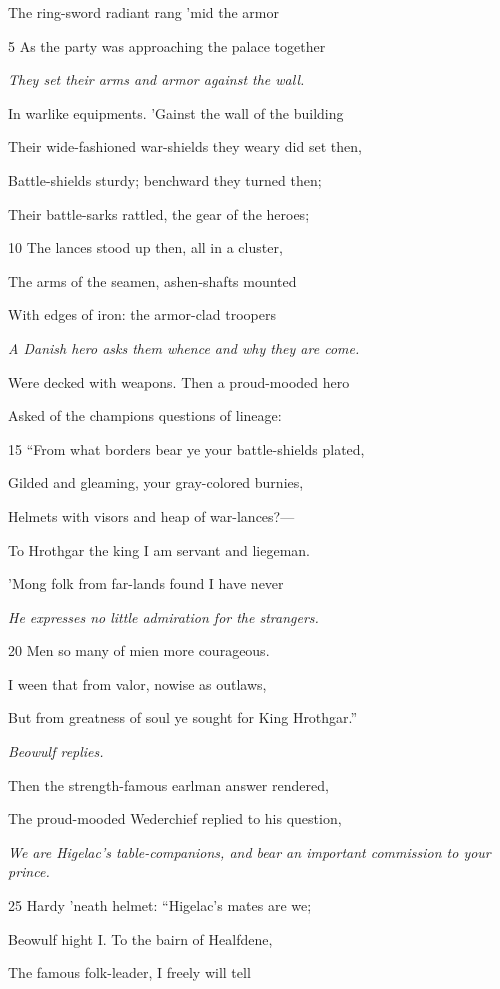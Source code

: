 The ring-sword radiant rang ’mid the armor

5
As the party was approaching the palace together

\emph{They set their
arms and armor
against the wall.}

In warlike equipments. ’Gainst the wall of the building

Their wide-fashioned war-shields they weary did set then,

Battle-shields sturdy; benchward they turned then;

Their battle-sarks rattled, the gear of the heroes;

10
The lances stood up then, all in a cluster,

The arms of the seamen, ashen-shafts mounted

With edges of iron: the armor-clad troopers

\emph{A Danish hero
asks them whence
and why they are
come.}

Were decked with weapons. Then a proud-mooded hero

Asked of the champions questions of lineage:

15
“From what borders bear ye your battle-shields plated,

Gilded and gleaming, your gray-colored burnies,

Helmets with visors and heap of war-lances?—

To Hrothgar the king I am servant and liegeman.

’Mong folk from far-lands found I have never

\emph{He expresses no
little admiration
for the strangers.}

20
Men so many of mien more courageous.

I ween that from valor, nowise as outlaws,

But from greatness of soul ye sought for King Hrothgar.”

\emph{Beowulf replies.}

Then the strength-famous earlman answer rendered,

The proud-mooded Wederchief replied to his question,

\emph{We are Higelac’s
table-companions,
and bear an important
commission to
your prince.}

25
Hardy ’neath helmet: “Higelac’s mates are we;

Beowulf hight I. To the bairn of Healfdene,

The famous folk-leader, I freely will tell

